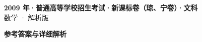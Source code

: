 \documentclass[zihao=-4, a4paper]{ctexart}
\begin{document}
\begin{center}
  {\Large\bfseries 2009 年·普通高等学校招生考试·新课标卷（琼、宁卷）·文科}\\[4pt]
  {\large 数学 · 解析版}
\end{center}
\medskip
{}

\clearpage
{}
\begin{center}{\Large\bfseries 参考答案与详细解析}\end{center}
\medskip

\end{document}
